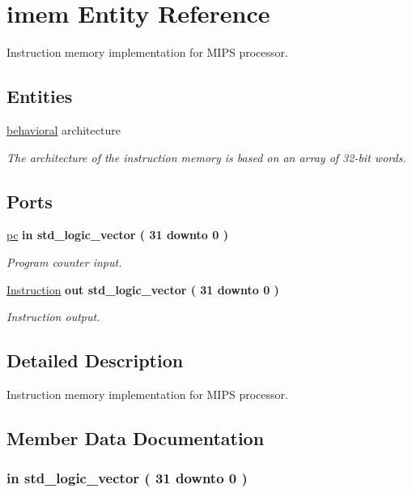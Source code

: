 \hypertarget{classimem}{\section{imem \-Entity \-Reference}
\label{classimem}
}


\-Instruction memory implementation for \-M\-I\-P\-S processor.  


\subsection*{\-Entities}
\begin{DoxyCompactItemize}
\item 
\hyperlink{classimem_1_1behavioral}{behavioral} architecture
\begin{DoxyCompactList}\small\item\em \-The architecture of the instruction memory is based on an array of 32-\/bit words. \end{DoxyCompactList}\end{DoxyCompactItemize}
\*
\*
\subsection*{\-Ports}
 \begin{DoxyCompactItemize}
\item 
\hyperlink{classimem_ad1a221c09af97e0f0a04247472ab8016}{pc}  {\bfseries {\bfseries in }} {\bfseries std\-\_\-logic\-\_\-vector (   31    downto    0  ) } 
\begin{DoxyCompactList}\small\item\em \-Program counter input. \end{DoxyCompactList}\item 
\hyperlink{classimem_ac89b0bccd70cd43f4ea4ae5521cf8052}{\-Instruction}  {\bfseries {\bfseries out }} {\bfseries std\-\_\-logic\-\_\-vector (   31    downto    0  ) } 
\begin{DoxyCompactList}\small\item\em \-Instruction output. \end{DoxyCompactList}\end{DoxyCompactItemize}


\subsection{\-Detailed \-Description}
\-Instruction memory implementation for \-M\-I\-P\-S processor. 

\subsection{\-Member \-Data \-Documentation}
\hypertarget{classimem_ad1a221c09af97e0f0a04247472ab8016}{
\subsubsection[{pc}]{ {\bfseries in } {\bfseries std\-\_\-logic\-\_\-vector (   31    downto    0  ) } }}\label{classimem_ad1a221c09af97e0f0a04247472ab8016}


